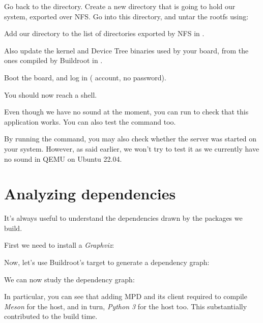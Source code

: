 Go back to the  directory. Create
a new  directory that is going to hold our system,
exported over NFS. Go into this directory, and untar the rootfs using:


Add our  directory to the list of directories exported
by NFS in .

Also update the kernel and Device Tree binaries used by your board,
from the ones compiled by Buildroot in .

Boot the board, and log in ( account, no password).

You should now reach a shell.

Even though we have no sound at the moment, you can run 
to check that this application works. You can also test the 
command too.

By running the  command, you may also check whether the 
server was started on your system. However, as said earlier, we won't try
to test it as we currently have no sound in QEMU on Ubuntu 22.04.

\section{Analyzing dependencies}

It's always useful to understand the dependencies drawn by the
packages we build.

First we need to install a {\em Graphviz}:


Now, let's use Buildroot's target to generate a
dependency graph:


We can now study the dependency graph:


In particular, you can see that adding MPD and its client
required to compile {\em Meson} for the host, and in turn,
{\em Python 3} for the host too. This substantially contributed to the
build time.


